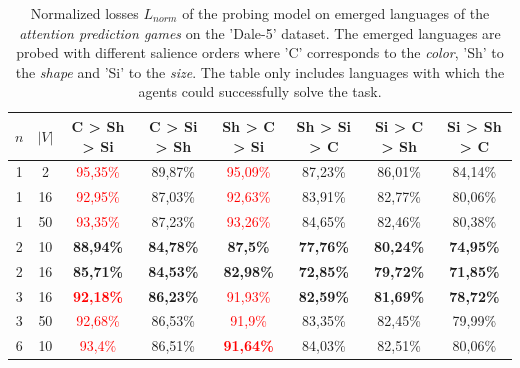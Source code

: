 \begin{table}[ht]
    \centering
    \begin{tabular}{cc|c|c|c|c|c|c}
        \toprule
        $n$ & $|V|$ & \textbf{C > Sh > Si}              & \textbf{C > Si > Sh} & \textbf{Sh > C > Si}              & \textbf{Sh > Si > C} & \textbf{Si > C > Sh} & \textbf{Si > Sh > C} \\\midrule
        {1} & {2}   & \textcolor{red}{95,35\%}          & {89,87\%}            & \textcolor{red}{95,09\%}          & {87,23\%}            & {86,01\%}            & {84,14\%}            \\
        {1} & {16}  & \textcolor{red}{92,95\%}          & {87,03\%}            & \textcolor{red}{92,63\%}          & {83,91\%}            & {82,77\%}            & {80,06\%}            \\
        {1} & {50}  & \textcolor{red}{93,35\%}          & {87,23\%}            & \textcolor{red}{93,26\%}          & {84,65\%}            & {82,46\%}            & {80,38\%}            \\
        {2} & {10}  & \textbf{88,94\%}                  & \textbf{84,78\%}     & \textbf{87,5\%}                   & \textbf{77,76\%}     & \textbf{80,24\%}     & \textbf{74,95\%}     \\
        {2} & {16}  & \textbf{85,71\%}                  & \textbf{84,53\%}     & \textbf{82,98\%}                  & \textbf{72,85\%}     & \textbf{79,72\%}     & \textbf{71,85\%}     \\
        {3} & {16}  & \textcolor{red}{\textbf{92,18\%}} & \textbf{86,23\%}     & \textcolor{red}{91,93\%}          & \textbf{82,59\%}     & \textbf{81,69\%}     & \textbf{78,72\%}     \\
        {3} & {50}  & \textcolor{red}{92,68\%}          & {86,53\%}            & \textcolor{red}{91,9\%}           & {83,35\%}            & {82,45\%}            & {79,99\%}            \\
        {6} & {10}  & \textcolor{red}{93,4\%}           & {86,51\%}            & \textcolor{red}{\textbf{91,64\%}} & {84,03\%}            & {82,51\%}            & {80,06\%}            \\
        \bottomrule
    \end{tabular}
    \caption{Normalized losses $L_{norm}$ of the probing model on emerged languages of the \emph{attention prediction games} on the 'Dale-5' dataset. The emerged languages are probed with different salience orders where 'C' corresponds to the \emph{color}, 'Sh' to the \emph{shape} and 'Si' to the \emph{size}. The table only includes languages with which the agents could successfully solve the task.}
    \label{tab:probing:attention-predictor:dale-5}
\end{table}

